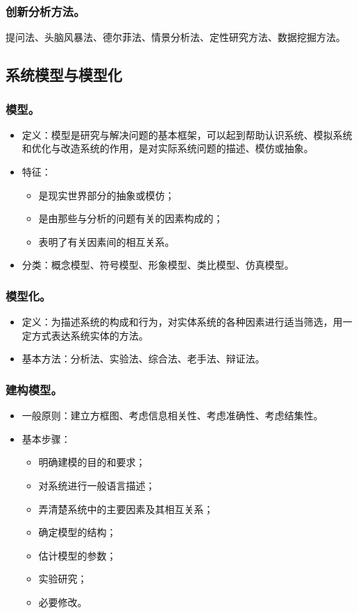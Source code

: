 \documentclass{article}
\begin{document}
\subsubsection{创新分析方法。}
提问法、头脑风暴法、德尔菲法、情景分析法、定性研究方法、数据挖掘方法。

\subsection{系统模型与模型化}

\subsubsection{模型。}
\begin{itemize}
    \item 定义：模型是研究与解决问题的基本框架，可以起到帮助认识系统、模拟系统和优化与改造系统的作用，是对实际系统问题的描述、模仿或抽象。
    \item 特征：
    \begin{itemize}
        \item 是现实世界部分的抽象或模仿；
        \item 是由那些与分析的问题有关的因素构成的；
        \item 表明了有关因素间的相互关系。
    \end{itemize}
    \item 分类：概念模型、符号模型、形象模型、类比模型、仿真模型。
\end{itemize}

\subsubsection{模型化。}
\begin{itemize}
    \item 定义：为描述系统的构成和行为，对实体系统的各种因素进行适当筛选，用一定方式表达系统实体的方法。
    \item 基本方法：分析法、实验法、综合法、老手法、辩证法。
\end{itemize}

\subsubsection{建构模型。}
\begin{itemize}
    \item 一般原则：建立方框图、考虑信息相关性、考虑准确性、考虑结集性。
    \item 基本步骤：
    \begin{itemize}
        \item 明确建模的目的和要求；
        \item 对系统进行一般语言描述；
        \item 弄清楚系统中的主要因素及其相互关系；
        \item 确定模型的结构；
        \item 估计模型的参数；
        \item 实验研究；
        \item 必要修改。
    \end{itemize}
\end{itemize}
\end{document}
